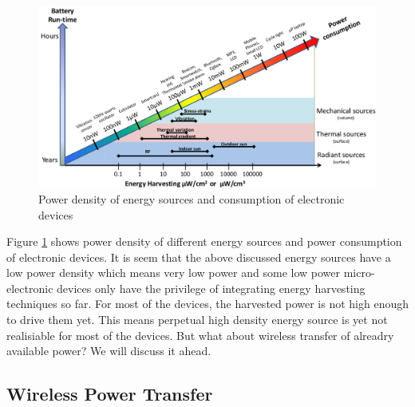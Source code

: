 \documentclass[12pt,a4paper,UKenglish]{article}
\begin{document}
\begin{figure}[H] %
   \centering
   \includegraphics[width=\textwidth]{img/power_density_2.png}
   \caption{Power density of energy sources and consumption of electronic devices \cite{power_density}}
   \label{fig:power_density}
\end{figure}

Figure \ref{fig:power_density} shows power density of different energy sources and power consumption of electronic 
devices. It is seem  that the above discussed energy sources have a low power density which means very low power 
and some low power micro-electronic devices only have the privilege of integrating energy harvesting techniques 
so far. For most of the devices, the harvested power is not high enough to drive them yet. This means perpetual 
high density energy source is yet not realisiable for most of the devices. But what about wireless transfer of 
alreadry available power? We will discuss it ahead. 


\subsection{Wireless Power Transfer}
\end{document}

